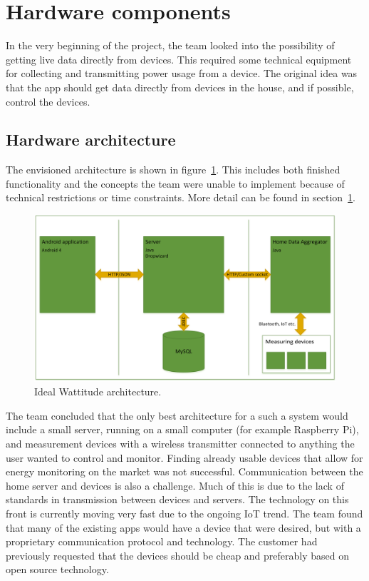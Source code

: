 \section{Hardware components}
\label{sec:hardwareComponents}
In the very beginning of the project, the team looked into the possibility of getting live data directly from devices. This required some technical equipment for collecting and transmitting power usage from a device. The original idea was that the app should get data directly from devices in the house, and if possible, control the devices.

\subsection{Hardware architecture}

The envisioned architecture is shown in figure~\ref{fig:idealArchitecture}. This includes both finished functionality and the concepts the team were unable to implement because of technical restrictions or time constraints. More detail can be found in section~\ref{sec:hardwareComponents}.


\begin{figure}[H]
\centering
\includegraphics[height=0.3\textheight]{ch/further/fig/architecture.png}
\caption{Ideal Wattitude architecture.}
\label{fig:idealArchitecture}
\end{figure}


The team concluded that the only best architecture for a such a system would include a small server, running on a small computer (for example Raspberry Pi), and measurement devices with a wireless transmitter connected to anything the user wanted to control and monitor. Finding already usable devices that allow for energy monitoring on the market was not successful. Communication between the home server and devices is also a challenge. Much of this is due to the lack of standards in transmission between devices and servers. The technology on this front is currently moving very fast due to the ongoing \gls{IoT} trend. The team found that many of the existing apps would have a device that were desired, but with a proprietary communication protocol and technology. The customer had previously requested that the devices should be cheap and preferably based on open source technology.

